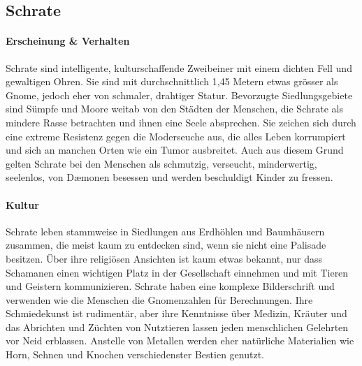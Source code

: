 \documentclass[12pt,twoside,twocolumn,openany]{book}
\begin{document}
\subsection{Schrate}


\paragraph{Erscheinung \& Verhalten}
Schrate sind intelligente, kulturschaffende Zweibeiner mit einem dichten Fell und gewaltigen Ohren. Sie sind mit durchschnittlich 1,45 Metern etwas grösser als Gnome, jedoch eher von schmaler, drahtiger Statur. Bevorzugte Siedlungsgebiete sind Sümpfe und Moore weitab von den Städten der Menschen, die Schrate als mindere Rasse betrachten und ihnen eine Seele absprechen. Sie zeichen sich durch eine extreme Resistenz gegen die Moderseuche aus, die alles Leben korrumpiert und sich an manchen Orten wie ein Tumor ausbreitet. Auch aus diesem Grund gelten Schrate bei den Menschen als schmutzig, verseucht, minderwertig, seelenlos, von D\ae monen besessen und werden beschuldigt Kinder zu fressen.

\paragraph{Kultur}
Schrate leben stammweise in Siedlungen  aus Erdhöhlen und Baumhäusern zusammen, die meist kaum zu entdecken sind, wenn sie nicht eine Palisade besitzen. Über ihre religiösen Ansichten ist kaum etwas bekannt, nur dass Schamanen einen wichtigen Platz in der Gesellschaft einnehmen und mit Tieren und Geistern kommunizieren.
Schrate haben eine komplexe Bilderschrift und verwenden wie die Menschen die Gnomenzahlen für Berechnungen. Ihre Schmiedekunst ist rudimentär, aber ihre Kenntnisse über Medizin, Kräuter und das Abrichten und Züchten von Nutztieren lassen jeden menschlichen Gelehrten vor Neid erblassen. Anstelle von Metallen werden eher natürliche Materialien wie Horn, Sehnen und Knochen verschiedenster Bestien genutzt.

\end{document}
